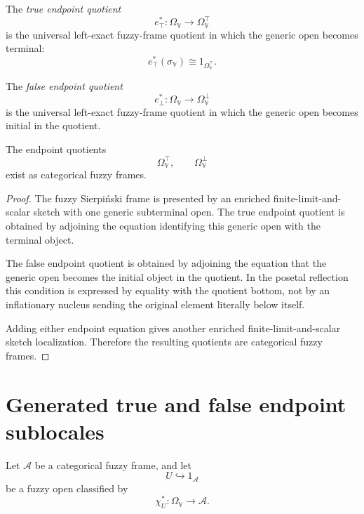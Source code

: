 \begin{definition}
\label{def:true-endpoint-quotient}
The \emph{true endpoint quotient}
\[
    e_{\top}^{\ast}:
    \Omega_{\mathbb V}\to\Omega_{\mathbb V}^{\top}
\]
is the universal left-exact fuzzy-frame quotient in which the generic open
becomes terminal:
\[
    e_{\top}^{\ast}(\sigma_{\mathbb V})
    \cong
    1_{\Omega_{\mathbb V}^{\top}}.
\]
\end{definition}

\begin{definition}
\label{def:false-endpoint-quotient}
The \emph{false endpoint quotient}
\[
    e_{\bot}^{\ast}:
    \Omega_{\mathbb V}\to\Omega_{\mathbb V}^{\bot}
\]
is the universal left-exact fuzzy-frame quotient in which the generic open
becomes initial in the quotient.
\end{definition}

\begin{proposition}
\label{prop:endpoint-quotients-exist}
The endpoint quotients
\[
    \Omega_{\mathbb V}^{\top},
    \qquad
    \Omega_{\mathbb V}^{\bot}
\]
exist as categorical fuzzy frames.
\end{proposition}

\begin{proof}
The fuzzy Sierpiński frame is presented by an enriched
finite-limit-and-scalar sketch with one generic subterminal open.  The true
endpoint quotient is obtained by adjoining the equation identifying this
generic open with the terminal object.

The false endpoint quotient is obtained by adjoining the equation that the
generic open becomes the initial object in the quotient.  In the posetal
reflection this condition is expressed by equality with the quotient bottom,
not by an inflationary nucleus sending the original element literally below
itself.

Adding either endpoint equation gives another enriched
finite-limit-and-scalar sketch localization.  Therefore the resulting
quotients are categorical fuzzy frames.
\end{proof}

\section{Generated true and false endpoint sublocales}
\label{sec:generated-endpoint-sublocales}

Let \(\mathcal A\) be a categorical fuzzy frame, and let
\[
    U\hookrightarrow1_{\mathcal A}
\]
be a fuzzy open classified by
\[
    \chi_U^\ast:\Omega_{\mathbb V}\to\mathcal A.
\]

